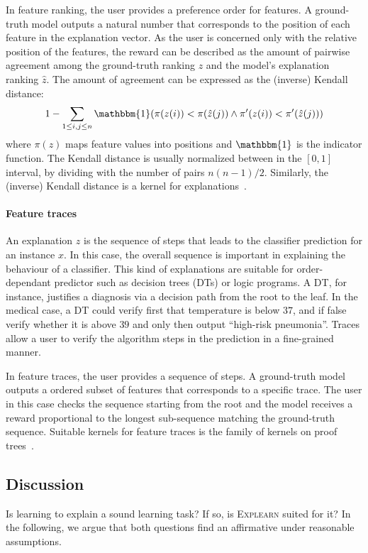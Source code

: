 \documentclass[letterpaper]{article} %
\newcommand{\explearn}{\textsc{Explearn}\xspace}
\begin{document}
In feature ranking, the user provides a preference order for features.
A ground-truth model outputs a natural number that corresponds to the position of each feature in the explanation vector. As the user is concerned only with the relative position of the features, the reward can be described as the amount of pairwise agreement among the ground-truth ranking $z$ and the model's explanation ranking $\hat{z}$. The amount of agreement can be expressed as the (inverse) Kendall distance: 
$$
    1 - \sum_{1 \leq i, j \leq n} \mathbbm{1}(\pi(z(i)) < \pi(\hat{z}(j)) \land \pi'(z(i)) < \pi'(\hat{z}(j)))
$$
where $\pi(z)$ maps feature values into positions and $\mathbbm{1}$ is the indicator function. The Kendall distance is usually normalized between in the $[0,1]$ interval, by dividing with the number of pairs $n(n{-}1)/2$. 
Similarly, the (inverse) Kendall distance is a kernel for explanations~\cite{jiao2015kendall}.

\paragraph{Feature traces} An explanation $z$ is the sequence of steps that leads to the classifier prediction for an instance $x$. In this case, the overall sequence is important in explaining the behaviour of a classifier. This kind of explanations are suitable for order-dependant predictor such as decision trees (DTs) or logic programs. A DT, for instance, justifies a diagnosis via a decision path from the root to the leaf. In the medical case, a DT could verify first that temperature is below $37$, and if false verify whether it is above $39$ and only then output ``high-risk pneumonia''. Traces allow a user to verify the algorithm steps in the prediction in a fine-grained manner.

In feature traces, the user provides a sequence of steps. A ground-truth model outputs a ordered subset of features that corresponds to a specific trace. The user in this case checks the sequence starting from the root and the model receives a reward proportional to the longest sub-sequence matching the ground-truth sequence. Suitable kernels for feature traces is the family of kernels on proof trees~\cite{passerini2006kernels}.


\subsection{Discussion}

Is learning to explain a sound learning task?  If so, is \explearn suited for it?  In the following, we argue that both questions find an affirmative under reasonable assumptions.
\end{document}
